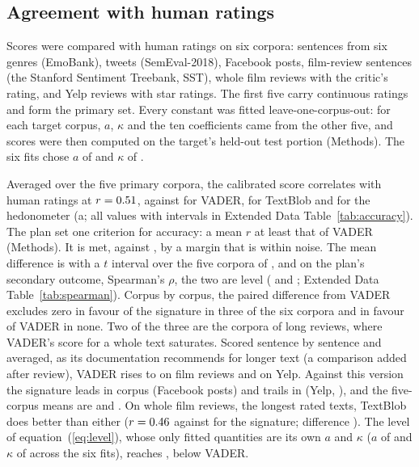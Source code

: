 
\subsection{Agreement with human ratings}

Scores were compared with human ratings on six corpora: sentences from six genres (EmoBank\cite{buechel2017}), tweets (SemEval-2018\cite{mohammad2018semeval}), Facebook posts\cite{preotiuc2016}, film-review sentences (the Stanford Sentiment Treebank, SST\cite{socher2013}), whole film reviews with the critic's rating\cite{pang2005}, and Yelp reviews with star ratings\cite{zhang2015}. The first five carry continuous ratings and form the primary set. Every constant was fitted leave-one-corpus-out: for each target corpus, $a$, $\kappa$ and the ten coefficients came from the other five, and scores were then computed on the target's held-out test portion (Methods). The six fits chose $a$ of \locoA{} and $\kappa$ of \locoKappa.

Averaged over the five primary corpora, the calibrated score correlates with human ratings at $r=0.51$, against \meanVader{} for VADER\cite{hutto2014}, \meanBlob{} for TextBlob\cite{loria2026} and \meanHedo{} for the hedonometer\cite{dodds2011} (a; all values with intervals in Extended Data Table~\ref{tab:accuracy}). The plan set one criterion for accuracy: a mean $r$ at least that of VADER (Methods). It is met, \meanSgwThree{} against \meanVaderThree, by a margin that is within noise. The mean difference is \dVaderMean{} with a $t$ interval over the five corpora of \dVaderMeanCI, and on the plan's secondary outcome, Spearman's $\rho$, the two are level (\rhoSgw{} and \rhoVader; Extended Data Table~\ref{tab:spearman}). Corpus by corpus, the paired difference from VADER excludes zero in favour of the signature in three of the six corpora and in favour of VADER in none. Two of the three are the corpora of long reviews, where VADER's score for a whole text saturates. Scored sentence by sentence and averaged, as its documentation recommends for longer text (a comparison added after review), VADER rises to \rVaderSentFilm{} on film reviews and \rVaderSentYelp{} on Yelp. Against this version the signature leads in \winsVaderSent{} corpus (Facebook posts) and trails in \lossesVaderSent{} (Yelp, \dVaderSentYelp), and the five-corpus means are \meanSgw{} and \meanVaderSent. On whole film reviews, the longest rated texts, TextBlob does better than either ($r=0.46$ against \rSgwFilm{} for the signature; difference \dBlobFilm). The level of equation~(\ref{eq:level}), whose only fitted quantities are its own $a$ and $\kappa$ ($a$ of \locoLevelA{} and $\kappa$ of \locoLevelKappa{} across the six fits), reaches \meanLevel, below VADER.


